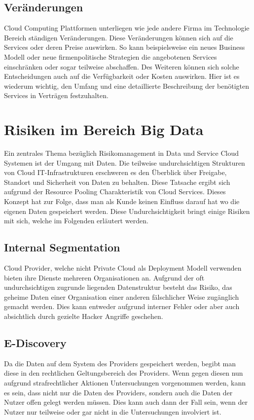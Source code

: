 \documentclass{report}
\begin{document}
\subsection{Veränderungen}
Cloud Computing Plattformen unterliegen wie jede andere Firma im Technologie Bereich ständigen Veränderungen. Diese Veränderungen können sich auf die Services oder deren Preise auswirken. So kann beispielsweise ein neues Business Modell oder neue firmenpolitische Strategien die angebotenen Services einschränken oder sogar teilweise abschaffen. Des Weiteren können sich solche Entscheidungen auch auf die Verfügbarkeit oder Kosten auswirken. Hier ist es wiederum wichtig, den Umfang und eine detaillierte Beschreibung der benötigten Services in Verträgen festzuhalten. \cite{mos2011}


\section{Risiken im Bereich Big Data}
Ein zentrales Thema bezüglich Risikomanagement in Data und Service Cloud Systemen ist der Umgang mit Daten. Die teilweise undurchsichtigen Strukturen von Cloud IT-Infrastrukturen erschweren es den Überblick über Freigabe, Standort und Sicherheit von Daten zu behalten. Diese Tatsache ergibt sich aufgrund der Resource Pooling Charakteristik von Cloud Services. Dieses Konzept hat zur Folge, dass man als Kunde keinen Einfluss darauf hat wo die eigenen Daten gespeichert werden. Diese Undurchsichtigkeit bringt einige Risiken mit sich, welche im Folgenden erläutert werden. 

\subsection{Internal Segmentation}
Cloud Provider, welche nicht Private Cloud als Deployment Modell verwenden bieten ihre Dienste mehreren Organisationen an. Aufgrund der oft undurchsichtigen zugrunde liegenden Datenstruktur besteht das Risiko, das geheime Daten einer Organisation einer anderen fälschlicher Weise zugänglich gemacht werden. Dies kann entweder aufgrund interner Fehler oder aber auch absichtlich durch gezielte Hacker Angriffe geschehen. \cite{mos2011}

\subsection{E-Discovery}
Da die Daten auf dem System des Providers gespeichert werden, begibt man diese in den rechtlichen Geltungsbereich des Providers. Wenn gegen diesen nun aufgrund strafrechtlicher Aktionen Untersuchungen vorgenommen werden, kann es sein, dass nicht nur die Daten des Providers, sondern auch die Daten der Nutzer offen gelegt werden müssen. Dies kann auch dann der Fall sein, wenn der Nutzer nur teilweise oder gar nicht in die Untersuchungen involviert ist. \cite{mos2011}
\end{document}
